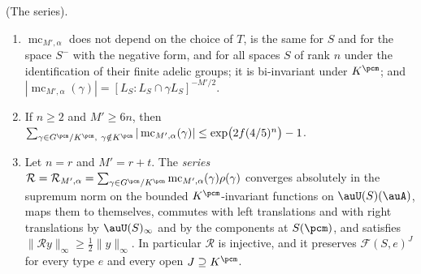 \documentclass[10pt]{amsart}
\theoremstyle{definition}
\theoremstyle{remark}
\providecommand{\pcF}{\mathcal F}
\providecommand{\pcRal}{\mathcal R}
\providecommand{\pcmc}{\operatorname{mc}}
\newenvironment{quotedthm}[2]{\par\medskip\noindent\begingroup
  \textbf{#1}#2.\ \itshape\ignorespaces}{\endgroup\par\medskip}
\begin{document}
\begin{quotedthm}{\cite[Lemma~2.11]{P53}}{ (The series)}
\begin{enumerate}
\item[(a)] $\pcmc_{M',\alpha}$ does not depend on the choice of $T$, is the same for $S$ and for
the space $S^-$ with the negative form, and for all spaces $S$ of rank $n$ under the identification
of their finite adelic groups; it is bi-invariant under $K^\pcm$; and
$|\pcmc_{M',\alpha}(\gamma)|=[L_S:L_S\cap\gamma L_S]^{-M'/2}$.
\item[(b)] If $n\ge2$ and $M'\ge6n$, then
$\sum_{\gamma\in G^\pcm/K^\pcm,\ \gamma\notin K^\pcm}|\pcmc_{M',\alpha}(\gamma)|\le\exp\bigl(2f(4/5)^n
\bigr)-1$.
\item[(c)] Let $n=r$ and $M'=r+t$. The \emph{series}
$\pcRal=\pcRal_{M',\alpha}=\sum_{\gamma\in G^\pcm/K^\pcm}\pcmc_{M',\alpha}(\gamma)\rho(\gamma)$
converges absolutely in the supremum norm on the bounded $K^\pcm$-invariant functions on
$\auU(S)(\auA)$, maps them to themselves, commutes with left translations and with right
translations by $\auU(S)_\infty$ and by the components at $S(\pcm)$, and satisfies
$\|\pcRal y\|_\infty\ge\tfrac12\|y\|_\infty$. In particular $\pcRal$ is injective, and it preserves
$\pcF(S,e)^J$ for every type $e$ and every open $J\supseteq K^\pcm$.
\end{enumerate}
\end{quotedthm}
\end{document}
